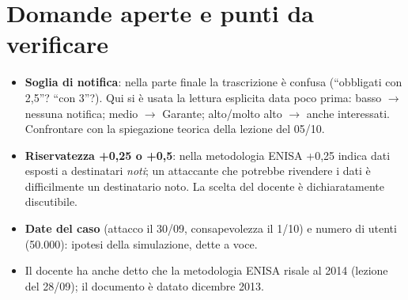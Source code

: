 \section{Domande aperte e punti da verificare}
\begin{verifica}
\begin{itemize}
  \item \textbf{Soglia di notifica}: nella parte finale la trascrizione è confusa (``obbligati con 2,5''?
    ``con 3''?). Qui si è usata la lettura esplicita data poco prima: basso $\rightarrow$ nessuna
    notifica; medio $\rightarrow$ Garante; alto/molto alto $\rightarrow$ anche interessati. Confrontare
    con la spiegazione teorica della lezione del 05/10.
  \item \textbf{Riservatezza +0,25 o +0,5}: nella metodologia ENISA +0,25 indica dati esposti a
    destinatari \emph{noti}; un attaccante che potrebbe rivendere i dati è difficilmente un destinatario
    noto. La scelta del docente è dichiaratamente discutibile.
  \item \textbf{Date del caso} (attacco il 30/09, consapevolezza il 1/10) e numero di utenti (50.000):
    ipotesi della simulazione, dette a voce.
  \item Il docente ha anche detto che la metodologia ENISA risale al 2014 (lezione del 28/09); il
    documento è datato dicembre 2013.
\end{itemize}
\end{verifica}
